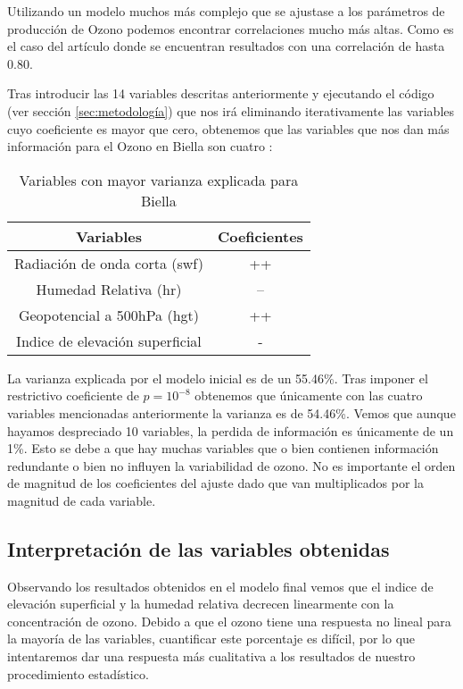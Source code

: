 \documentclass[12pt]{article}
\begin{document}
Utilizando un modelo muchos más complejo que se ajustase a los parámetros de producción de Ozono podemos encontrar correlaciones mucho más altas. Como es el caso del artículo  \citep{camalier2017} 
donde se  encuentran resultados con una correlación de hasta 0.80.



Tras introducir las 14 variables descritas anteriormente y ejecutando el código (ver sección \ref{sec:metodología}) que nos irá eliminando iterativamente las variables cuyo coeficiente es mayor que cero, obtenemos que las variables que nos dan más información para el Ozono en Biella son cuatro :
\begin{table}[]
\centering
\label{tabla}
\begin{tabular}{|c|c|}
\hline
Variables                    & Coeficientes \\ \hline
Radiación de onda corta (swf)   & ++                                \\
Humedad Relativa (hr)           & --                                 \\
Geopotencial a 500hPa (hgt)     & ++                                 \\ 
Indice de elevación superficial & -                           \\     \hline
\end{tabular}
\caption{Variables con mayor varianza explicada para Biella}\label{tabla}
\end{table}


La varianza explicada por el  modelo inicial es  de un 55.46\%. Tras imponer el restrictivo coeficiente de $p=10^{-8}$ obtenemos que únicamente con las cuatro variables mencionadas anteriormente la varianza es de  54.46\%. Vemos que aunque hayamos despreciado 10 variables, la perdida de información es únicamente de un 1\%. Esto se debe a que hay muchas variables que o bien contienen información redundante o  bien  no influyen la variabilidad de ozono.  No es importante el orden de magnitud de  los coeficientes del ajuste dado que van multiplicados por la magnitud de cada variable.

\subsection{Interpretación  de las variables obtenidas} \label{subsec:4.1}
Observando los resultados obtenidos en el modelo final vemos que el  indice de elevación superficial y la humedad relativa decrecen linearmente con la concentración de ozono. Debido a que el ozono tiene una respuesta no lineal para la mayoría de las variables, cuantificar este porcentaje es difícil, por lo que intentaremos dar una respuesta más cualitativa a los resultados de nuestro procedimiento estadístico.
\end{document}
